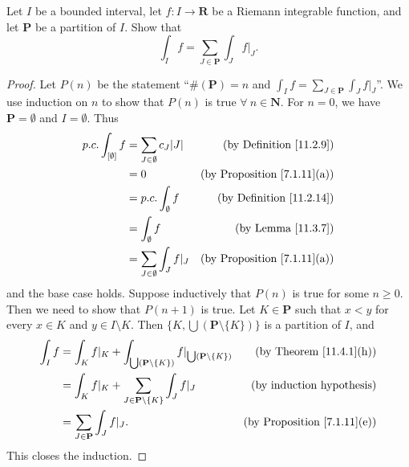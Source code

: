 \begin{exercise}\label{ex 11.4.3}
    Let \(I\) be a bounded interval, let \(f : I \to \mathbf{R}\) be a Riemann integrable function, and let \(\mathbf{P}\) be a partition of \(I\).
    Show that
    \[
        \int_I f = \sum_{J \in \mathbf{P}} \int_J f|_J.
    \]
\end{exercise}

\begin{proof}
    Let \(P(n)\) be the statement ``\(\#(\mathbf{P}) = n\) and \(\int_I f = \sum_{J \in \mathbf{P}} \int_J f|_J\)''.
    We use induction on \(n\) to show that \(P(n)\) is true \(\forall\ n \in \mathbf{N}\).
    For \(n = 0\), we have \(\mathbf{P} = \emptyset\) and \(I = \emptyset\).
    Thus
    \begin{align*}
        p.c. \int_{[\emptyset]} f & = \sum_{J \in \emptyset} c_J \abs*{J} & \text{(by Definition \ref{11.2.9})}     \\
                                  & = 0                                   & \text{(by Proposition \ref{7.1.11}(a))} \\
                                  & = p.c. \int_{\emptyset} f             & \text{(by Definition \ref{11.2.14})}    \\
                                  & = \int_{\emptyset} f                  & \text{(by Lemma \ref{11.3.7})}          \\
                                  & = \sum_{J \in \emptyset} \int_J f|_J  & \text{(by Proposition \ref{7.1.11}(a))}
    \end{align*}
    and the base case holds.
    Suppose inductively that \(P(n)\) is true for some \(n \geq 0\).
    Then we need to show that \(P(n + 1)\) is true.
    Let \(K \in \mathbf{P}\) such that \(x < y\) for every \(x \in K\) and \(y \in I \setminus K\).
    Then \(\big\{K, \bigcup (\mathbf{P} \setminus \{K\})\big\}\) is a partition of \(I\), and
    \begin{align*}
        \int_I f & = \int_K f|_K + \int_{\bigcup (\mathbf{P} \setminus \{K\})} f|_{\bigcup (\mathbf{P} \setminus \{K\})} & \text{(by Theorem \ref{11.4.1}(h))}     \\
                 & = \int_K f|_K + \sum_{J \in \mathbf{P} \setminus \{K\}} \int_J f|_J                                   & \text{(by induction hypothesis)}        \\
                 & = \sum_{J \in \mathbf{P}} \int_J f|_J.                                                                & \text{(by Proposition \ref{7.1.11}(e))}
    \end{align*}
    This closes the induction.
\end{proof}

